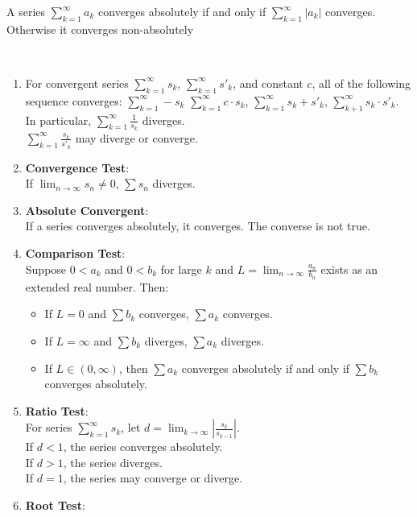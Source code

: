 \documentclass[../note.tex]{subfiles}
\begin{document}
\begin{definition} A series $\sum^{\infty}_{k=1}a_k$ converges absolutely if and only if $\sum^{\infty}_{k=1}|a_k|$ converges. Otherwise it converges non-absolutely
\end{definition}
\begin{theorem}\label{th:ConvergenceReveries}
\ 
\begin{enumerate}
	\item For convergent series $\sum^{\infty}_{k=1} s_k$, $\sum^{\infty}_{k=1}s'_k$, and constant $c$, all of the following sequence converges:
		$\sum^{\infty}_{k=1}-s_k$ $\sum^{\infty}_{k=1}c\cdot s_k$, $\sum^{\infty}_{k=1}s_k+s'_k$, $\sum^{\infty}_{k+1}s_k\cdot s'_k$.\\
		In particular, $\sum^{\infty}_{k=1}\frac{1}{s_k}$ diverges.\\
		$\sum^{\infty}_{k=1}\frac{s_k}{s'_k}$ may diverge or converge.
	\item \textbf{Convergence Test}:\\
		If $\lim_{n \rightarrow \infty} s_n \neq 0$, $\sum s_n$ diverges.
	\item \label{th:ConvergenceReveries:en:absoluteconverge} \textbf{Absolute Convergent}:\\
		If a series converges absolutely, it converges. The converse is not true. 
	\item \textbf{Comparison Test}:\\
		Suppose $0<a_k$ and $0<b_k$ for large $k$ and $L = \lim_{n \rightarrow \infty} \frac{a_n}{b_n}$ exists as an extended real number. Then:
		\begin{itemize}
			\item If $L=0$ and $\sum b_k$ converges, $\sum a_k$ converges.
			\item If $L=\infty$ and $\sum b_k$ diverges, $\sum a_k$ diverges.
			\item If $L \in (0, \infty)$, then $\sum a_k$ converges absolutely if and only if $\sum b_k$ converges absolutely.
		\end{itemize}
	\item \textbf{Ratio Test}:\\
		For series $\sum^{\infty}_{k=1}s_k$, let $d=\lim_{k \to \infty} |\frac{s_k}{s_{k-1}}|$.\\
		If $d<1$, the series converges absolutely.\\
		If $d>1$, the series diverges.\\
		If $d=1$, the series may converge or diverge.
	\item \textbf{Root Test}:\\

\end{enumerate}
\end{theorem}
\end{document}
